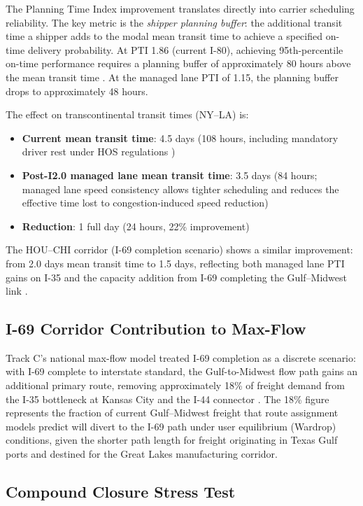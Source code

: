 The Planning Time Index improvement translates directly into carrier scheduling reliability. The key metric is the \textit{shipper planning buffer}: the additional transit time a shipper adds to the modal mean transit time to achieve a specified on-time delivery probability. At PTI 1.86 (current I-80), achieving 95th-percentile on-time performance requires a planning buffer of approximately 80 hours above the mean transit time \citep{ROUTE_C1}. At the managed lane PTI of 1.15, the planning buffer drops to approximately 48 hours.

The effect on transcontinental transit times (NY--LA) is:
\begin{itemize}
  \item \textbf{Current mean transit time}: 4.5 days (108 hours, including mandatory driver rest under HOS regulations \citep{USDOT_FMCSA2022})
  \item \textbf{Post-I2.0 managed lane mean transit time}: 3.5 days (84 hours; managed lane speed consistency allows tighter scheduling and reduces the effective time lost to congestion-induced speed reduction)
  \item \textbf{Reduction}: 1 full day (24 hours, 22\% improvement)
\end{itemize}

The HOU--CHI corridor (I-69 completion scenario) shows a similar improvement: from 2.0 days mean transit time to 1.5 days, reflecting both managed lane PTI gains on I-35 and the capacity addition from I-69 completing the Gulf--Midwest link \citep{ROUTE_C2}.

\subsection{I-69 Corridor Contribution to Max-Flow}

Track C's national max-flow model treated I-69 completion as a discrete scenario: with I-69 complete to interstate standard, the Gulf-to-Midwest flow path gains an additional primary route, removing approximately 18\% of freight demand from the I-35 bottleneck at Kansas City and the I-44 connector \citep{ROUTE_C2}. The 18\% figure represents the fraction of current Gulf--Midwest freight that route assignment models predict will divert to the I-69 path under user equilibrium (Wardrop) conditions, given the shorter path length for freight originating in Texas Gulf ports and destined for the Great Lakes manufacturing corridor.

\subsection{Compound Closure Stress Test}

